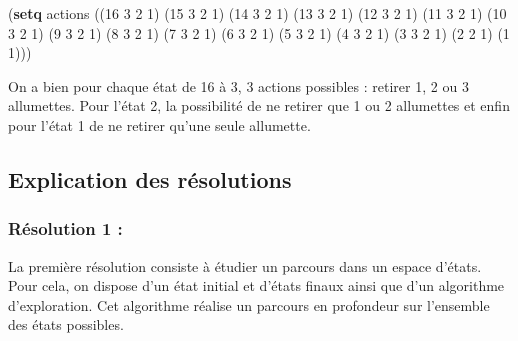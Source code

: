 \documentclass[
]{article}
\newenvironment{Shaded}{}{}
\newcommand{\DecValTok}[1]{\textcolor[rgb]{0.25,0.63,0.44}{#1}}
\newcommand{\KeywordTok}[1]{\textcolor[rgb]{0.00,0.44,0.13}{\textbf{#1}}}
\newcommand{\NormalTok}[1]{#1}
\begin{document}
\begin{Shaded}
\begin{Highlighting}[]
\NormalTok{(}\KeywordTok{setq}\NormalTok{ actions \textquotesingle{}((}\DecValTok{16} \DecValTok{3} \DecValTok{2} \DecValTok{1}\NormalTok{) (}\DecValTok{15} \DecValTok{3} \DecValTok{2} \DecValTok{1}\NormalTok{) (}\DecValTok{14} \DecValTok{3} \DecValTok{2} \DecValTok{1}\NormalTok{) (}\DecValTok{13} \DecValTok{3} \DecValTok{2} \DecValTok{1}\NormalTok{) (}\DecValTok{12} \DecValTok{3} \DecValTok{2} \DecValTok{1}\NormalTok{) (}\DecValTok{11} \DecValTok{3} \DecValTok{2} \DecValTok{1}\NormalTok{) }
\NormalTok{(}\DecValTok{10} \DecValTok{3} \DecValTok{2} \DecValTok{1}\NormalTok{) (}\DecValTok{9} \DecValTok{3} \DecValTok{2} \DecValTok{1}\NormalTok{) (}\DecValTok{8} \DecValTok{3} \DecValTok{2} \DecValTok{1}\NormalTok{) (}\DecValTok{7} \DecValTok{3} \DecValTok{2} \DecValTok{1}\NormalTok{) (}\DecValTok{6} \DecValTok{3} \DecValTok{2} \DecValTok{1}\NormalTok{) (}\DecValTok{5} \DecValTok{3} \DecValTok{2} \DecValTok{1}\NormalTok{) (}\DecValTok{4} \DecValTok{3} \DecValTok{2} \DecValTok{1}\NormalTok{) (}\DecValTok{3} \DecValTok{3} \DecValTok{2} \DecValTok{1}\NormalTok{) (}\DecValTok{2} \DecValTok{2} \DecValTok{1}\NormalTok{) (}\DecValTok{1} \DecValTok{1}\NormalTok{)))}
\end{Highlighting}
\end{Shaded}

On a bien pour chaque état de 16 à 3, 3 actions possibles : retirer 1, 2
ou 3 allumettes. Pour l'état 2, la possibilité de ne retirer que 1 ou 2
allumettes et enfin pour l'état 1 de ne retirer qu'une seule allumette.

\hypertarget{explication-des-ruxe9solutions}{%
\subsection{Explication des
résolutions}\label{explication-des-ruxe9solutions}}

\hypertarget{ruxe9solution-1}{%
\subsubsection{Résolution 1 :}\label{ruxe9solution-1}}

La première résolution consiste à étudier un parcours dans un espace
d'états. Pour cela, on dispose d'un état initial et d'états finaux ainsi
que d'un algorithme d'exploration. Cet algorithme réalise un parcours en
profondeur sur l'ensemble des états possibles.
\end{document}
